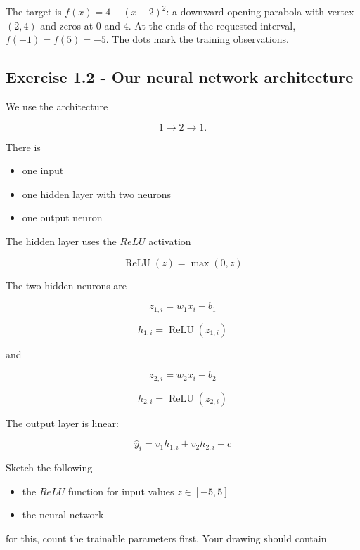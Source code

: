 \documentclass[10pt]{article}
\begin{document}
The target is $f(x)=4-(x-2)^2$: a downward-opening parabola with vertex $(2,4)$ and zeros at $0$ and $4$. At the ends of the requested interval, $f(-1)=f(5)=-5$. The dots mark the training observations.
\begin{center}
\end{center}
\par\endgroup

\subsection*{Exercise 1.2 - Our neural network architecture}
We use the architecture

\[
1\rightarrow2\rightarrow1.
\]

There is

\begin{itemize}
\item
one input

\item
one hidden layer with two neurons

\item
one output neuron

\end{itemize}
The hidden layer uses the $ReLU$ activation

\[
\operatorname{ReLU}(z)=\max(0,z)
\]

The two hidden neurons are

\[
z_{1,i}=w_1x_i+b_1
\]

\[
h_{1,i}=\operatorname{ReLU}(z_{1,i})
\]

and

\[
z_{2,i}=w_2x_i+b_2
\]

\[
h_{2,i}=\operatorname{ReLU}(z_{2,i})
\]

The output layer is linear:

\[
\hat y_i=v_1h_{1,i}+v_2h_{2,i}+c
\]

Sketch the following

\begin{itemize}
\item
the $ReLU$ function for input values $z\in[-5,5]$

\item
the neural network

\end{itemize}
for this, count the trainable parameters first. Your drawing should contain
\end{document}
